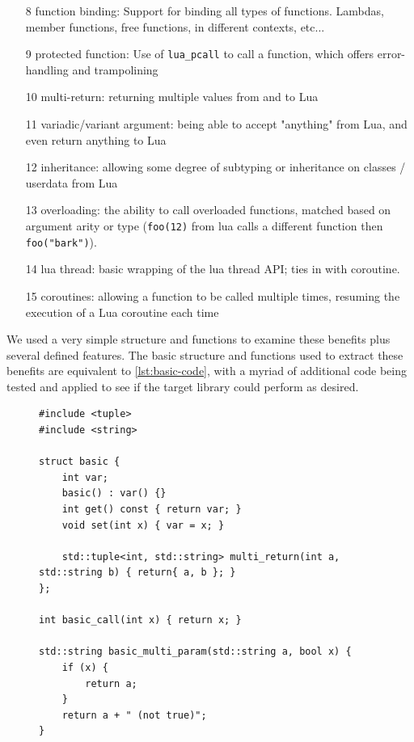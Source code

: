\documentclass[conference,compsoc]{IEEEtran}
\begin{document}
\begin{itemize}
	\item[8] function binding: Support for binding all types of functions. Lambdas, member functions, free functions, in different contexts, etc...
	\item[9] protected function: Use of \lstinline|lua_pcall| to call a function, which offers error-handling and trampolining	
	\item[10] multi-return: returning multiple values from and to Lua
	\item[11] variadic/variant argument: being able to accept "anything" from Lua, and even return anything to Lua
	\item[12] inheritance: allowing some degree of subtyping or inheritance on classes / userdata from Lua
	\item[13] overloading: the ability to call overloaded functions, matched based on argument arity or type (\lstinline|foo(12)| from lua calls a different function then \lstinline|foo("bark")|).
	\item[14] lua thread: basic wrapping of the lua thread API; ties in with coroutine.
	\item[15] coroutines: allowing a function to be called multiple times, resuming the execution of a Lua coroutine each time
\end{itemize}

We used a very simple structure and functions to examine these benefits plus several defined features. The basic structure and functions used to extract these benefits are equivalent to \cref{lst:basic-code}, with a myriad of additional code being tested and applied to see if the target library could perform as desired.

\begin{figure}
\begin{lstlisting}[caption={Basic classes and functions that were attempted to be bound and integrated into various libraries.},
label={lst:basic-code}]
#include <tuple>
#include <string>

struct basic {
	int var;
	basic() : var() {}
	int get() const { return var; }
	void set(int x) { var = x; }

	std::tuple<int, std::string> multi_return(int a, std::string b) { return{ a, b }; }
};

int basic_call(int x) { return x; }

std::string basic_multi_param(std::string a, bool x) {
	if (x) {
		return a;
	}
	return a + " (not true)";
}
\end{lstlisting}
\end{figure}
\end{document}

